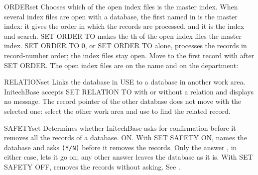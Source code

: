 \begin{XbaseEntry}{ORDER}{set}
Chooses which of the open index files is the master index.
\Syntax
{}
\Usage
When several index files are open with a database, the first named in
 is the master index: it gives the order in which the records are
processed, and it is the index  and  search.  SET ORDER
TO  makes the th of the open index files the master index.  SET
ORDER TO 0, or SET ORDER TO alone, processes the records in record-number
order; the index files stay open.
\Tips
Move to the first record with  after SET ORDER.
\Examples
The open index files are on the name and on the department:
\end{XbaseEntry}

\begin{XbaseEntry}{RELATION}{set}
Links the database in USE to a database in another work area.
\Syntax
{}
\Usage
InitechBase accepts SET RELATION TO with or without a relation and displays no
message.  The record pointer of the other database does not move with the
selected one: select the other work area and use  to find the related
record.
\end{XbaseEntry}

\begin{XbaseEntry}{SAFETY}{set}
Determines whether InitechBase asks for confirmation before it removes all
the records of a database.
\Syntax
{}
\Defaults
ON.
\Usage
With SET SAFETY ON,  names the database and asks \texttt{(Y/N)}
before it removes the records.  Only the answer , in either case,
lets it go on; any other answer leaves the database as it is.  With SET
SAFETY OFF,  removes the records without asking.
\Examples
See .
\end{XbaseEntry}

